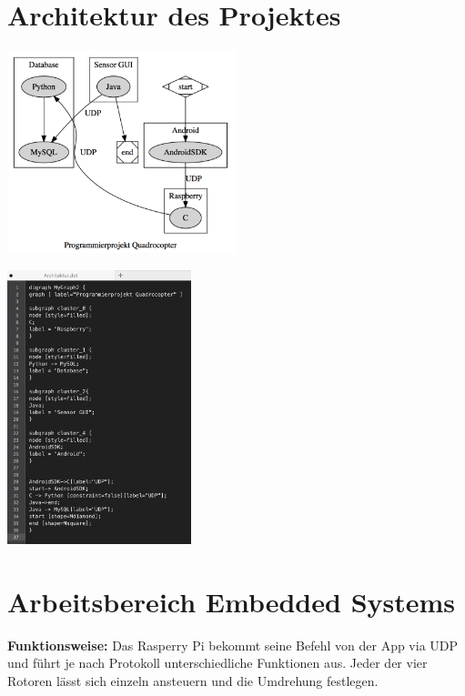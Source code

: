 \documentclass[fleqn,10pt]{SelfArx} %
\begin{document}

\section{Architektur des Projektes}

\includegraphics[width=0.5\textwidth]{architektur.png} 
\newline 
{}


\includegraphics[width=0.4\textwidth]{Architektur_screenshot.png} 
\newline 
{}


\section{Arbeitsbereich Embedded Systems}

\textbf{Funktionsweise:} \newline 
Das Rasperry Pi bekommt seine Befehl von der App via UDP und führt je nach Protokoll unterschiedliche Funktionen aus.  Jeder der vier Rotoren lässt sich einzeln ansteuern und die Umdrehung festlegen.
\end{document}
